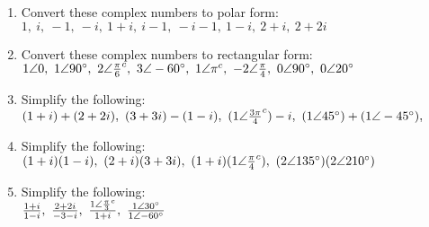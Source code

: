 \begin{enumerate}

\item{Convert these complex numbers to polar form: \\ $1,\  i ,\  -1,\  -i,\  1+i,\  i-1,\  -i-1,\  1-i,\  2+i,\  2+2i$}

\item{Convert these complex numbers to rectangular form: \\ $1\angle0,\   1\angle90^\circ,\  2\angle\frac{\pi}{6}^c,\   3\angle-60^\circ,\  1\angle\pi^c,\  -2\angle\frac{\pi}{4},\  0\angle90^\circ,\  0\angle20^\circ$}

\item{Simplify the following: \\ $(1+i)+(2+2i),\ (3+3i)-(1-i),\ (1\angle\frac{3\pi}{4}\rad)-i,\  (1\angle45\degree)+(1\angle-45\degree), $}

\item{Simplify the following: \\ $(1+i)(1-i),\ (2+i)(3+3i),\ (1+i)(1\angle\frac{\pi}{4}\rad),\ (2\angle135\degree)(2\angle210\degree)$}

\item{Simplify the following: \\ $\frac{1+i}{1-i},\ \frac{2+2i}{-3-i},\ \frac{1\angle\frac{\pi}{3}\rad}{1+i},\ \frac{1\angle30\degree}{1\angle-60\degree}$}

\end{enumerate}